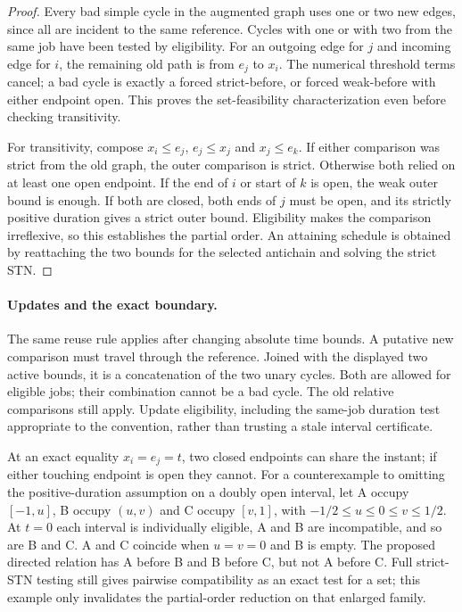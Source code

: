 \documentclass[11pt]{article}
\begin{document}
\begin{proof}
Every bad simple cycle in the augmented graph uses one or two new edges, since all are incident to the same reference. Cycles with one or with two from the same job have been tested by eligibility. For an outgoing edge for $j$ and incoming edge for $i$, the remaining old path is from $e_j$ to $x_i$. The numerical threshold terms cancel; a bad cycle is exactly a forced strict-before, or forced weak-before with either endpoint open. This proves the set-feasibility characterization even before checking transitivity.

For transitivity, compose $x_i\le e_j$, $e_j\le x_j$ and $x_j\le e_k$. If either comparison was strict from the old graph, the outer comparison is strict. Otherwise both relied on at least one open endpoint. If the end of $i$ or start of $k$ is open, the weak outer bound is enough. If both are closed, both ends of $j$ must be open, and its strictly positive duration gives a strict outer bound. Eligibility makes the comparison irreflexive, so this establishes the partial order. An attaining schedule is obtained by reattaching the two bounds for the selected antichain and solving the strict STN.
\end{proof}

\paragraph{Updates and the exact boundary.}
The same reuse rule applies after changing absolute time bounds. A putative new comparison must travel through the reference. Joined with the displayed two active bounds, it is a concatenation of the two unary cycles. Both are allowed for eligible jobs; their combination cannot be a bad cycle. The old relative comparisons still apply. Update eligibility, including the same-job duration test appropriate to the convention, rather than trusting a stale interval certificate.

At an exact equality $x_i=e_j=t$, two closed endpoints can share the instant; if either touching endpoint is open they cannot. For a counterexample to omitting the positive-duration assumption on a doubly open interval, let A occupy $[-1,u]$, B occupy $(u,v)$ and C occupy $[v,1]$, with $-1/2\le u\le0\le v\le1/2$. At $t=0$ each interval is individually eligible, A and B are incompatible, and so are B and C. A and C coincide when $u=v=0$ and B is empty. The proposed directed relation has A before B and B before C, but not A before C. Full strict-STN testing still gives pairwise compatibility as an exact test for a set; this example only invalidates the partial-order reduction on that enlarged family.
\end{document}
